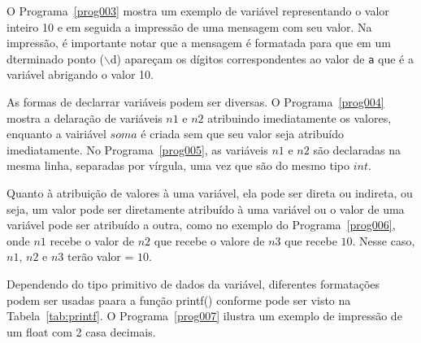 \documentclass[11pt,fleqn]{book} %
\begin{document}
O Programa~\ref{prog003} mostra um exemplo de variável representando o valor inteiro 10 e em seguida a impressão de uma mensagem com seu valor.
Na impressão, é importante notar que a mensagem é formatada para que em um dterminado ponto ($\backslash$d) apareçam os dígitos correspondentes ao valor de \texttt{a} que é a variável abrigando o valor 10.



As formas de declarrar variáveis podem ser diversas. O Programa~\ref{prog004} mostra a delaração de variáveis $n1$ e $n2$ atribuindo imediatamente os valores, enquanto a vairiável $soma$ é criada sem que seu valor seja atribuído imediatamente. No Programa~\ref{prog005}, as variáveis $n1$ e $n2$ são declaradas na mesma linha, separadas por vírgula, uma vez que são do mesmo tipo $int$.





Quanto à atribuição de valores à uma variável, ela pode ser direta ou indireta, ou seja, um valor pode ser diretamente atribuído à uma variável ou o valor de uma variável pode ser atribuído a outra, como no exemplo do Programa~\ref{prog006}, onde $n1$ recebe o valor de $n2$ que recebe o valore de $n3$ que recebe $10$. Nesse caso, $n1$, $n2$ e $n3$ terão valor = $10$.



Dependendo do tipo primitivo de dados da variável, diferentes formatações podem ser usadas paara a função printf() conforme pode ser visto na Tabela~\ref{tab:printf}. O Programa~\ref{prog007} ilustra um exemplo de impressão de um float com 2 casa decimais.


\end{document}

